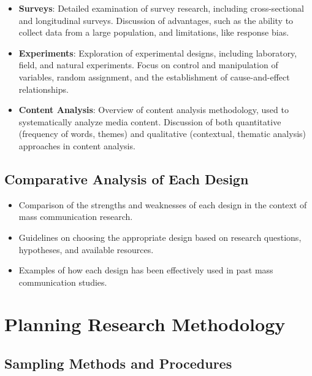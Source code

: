 \documentclass[
]{book}
\begin{document}
\begin{itemize}
\item
  \textbf{Surveys}: Detailed examination of survey research, including cross-sectional and longitudinal surveys. Discussion of advantages, such as the ability to collect data from a large population, and limitations, like response bias.
\item
  \textbf{Experiments}: Exploration of experimental designs, including laboratory, field, and natural experiments. Focus on control and manipulation of variables, random assignment, and the establishment of cause-and-effect relationships.
\item
  \textbf{Content Analysis}: Overview of content analysis methodology, used to systematically analyze media content. Discussion of both quantitative (frequency of words, themes) and qualitative (contextual, thematic analysis) approaches in content analysis.
\end{itemize}

\hypertarget{comparative-analysis-of-each-design}{%
\subsection*{Comparative Analysis of Each Design}\label{comparative-analysis-of-each-design}}

\begin{itemize}
\item
  Comparison of the strengths and weaknesses of each design in the context of mass communication research.
\item
  Guidelines on choosing the appropriate design based on research questions, hypotheses, and available resources.
\item
  Examples of how each design has been effectively used in past mass communication studies.
\end{itemize}

\hypertarget{planning-research-methodology}{%
\section*{Planning Research Methodology}\label{planning-research-methodology}}

\hypertarget{sampling-methods-and-procedures}{%
\subsection*{Sampling Methods and Procedures}\label{sampling-methods-and-procedures}}
\end{document}
